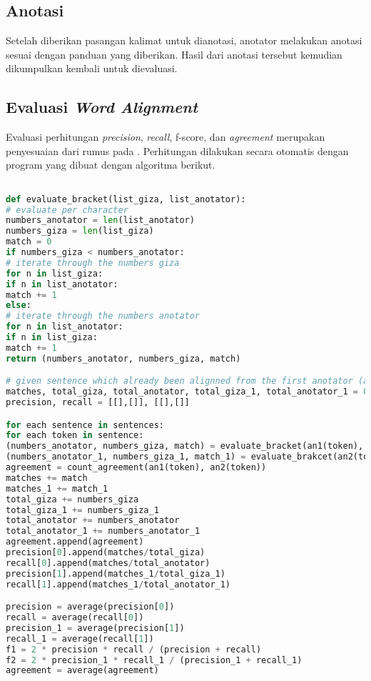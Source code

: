 \subsection{Anotasi}
Setelah diberikan pasangan kalimat untuk dianotasi, anotator melakukan anotasi sesuai dengan panduan yang diberikan. Hasil dari anotasi tersebut kemudian dikumpulkan kembali untuk dievaluasi.

\subsection{Evaluasi \textit{Word Alignment}}
Evaluasi perhitungan \textit{precision}, \textit{recall}, f-score, dan \textit{agreement} merupakan penyesuaian dari rumus pada \citep{mihalcea2003evaluation}. Perhitungan dilakukan secara otomatis dengan program yang dibuat dengan algoritma berikut.

\begin{lstlisting}[language=Python, caption={Word Alignment Evaluation}, label={word-alignment-evaluation}]

def evaluate_bracket(list_giza, list_anotator):
# evaluate per character
numbers_anotator = len(list_anotator)
numbers_giza = len(list_giza)
match = 0
if numbers_giza < numbers_anotator:
# iterate through the numbers giza
for n in list_giza:
if n in list_anotator:
match += 1
else:
# iterate through the numbers anotator
for n in list_anotator:
if n in list_giza:
match += 1
return (numbers_anotator, numbers_giza, match)

# given sentence which already been alignned from the first anotator (an1), second anotator(an2), and giza(giza)
matches, total_giza, total_anotator, total_giza_1, total_anotator_1 = 0, 0, 0, 0, 0
precision, recall = [[],[]], [[],[]]

for each sentence in sentences:
for each token in sentence:
(numbers_anotator, numbers_giza, match) = evaluate_bracket(an1(token), giza(token))
(numbers_anotator_1, numbers_giza_1, match_1) = evaluate_brakcet(an2(token), giza(token))
agreement = count_agreement(an1(token), an2(token))
matches += match
matches_1 += match_1
total_giza += numbers_giza
total_giza_1 += numbers_giza_1
total_anotator += numbers_anotator
total_anotator_1 += numbers_anotator_1
agreement.append(agreement)
precision[0].append(matches/total_giza)
recall[0].append(matches/total_anotator)
precision[1].append(matches_1/total_giza_1)
recall[1].append(matches_1/total_anotator_1)

precision = average(precision[0])
recall = average(recall[0])
precision_1 = average(precision[1])
recall_1 = average(recall[1])
f1 = 2 * precision * recall / (precision + recall)
f2 = 2 * precision_1 * recall_1 / (precision_1 + recall_1)
agreement = average(agreement)	

\end{lstlisting}


